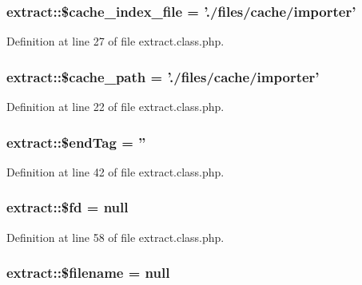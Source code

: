 \hypertarget{classextract_a6bd40f89eeb4e608723a39f5824d0c1e}{
\subsubsection[{\$cache\+\_\+index\+\_\+file}]{\setlength{\rightskip}{0pt plus 5cm}extract\+::\$cache\+\_\+index\+\_\+file = './files/cache/{\bf importer}'}}\label{classextract_a6bd40f89eeb4e608723a39f5824d0c1e}


Definition at line 27 of file extract.\+class.\+php.

\hypertarget{classextract_a00f1309c1e975d137a9f17ad9afc5d1e}{
\subsubsection[{\$cache\+\_\+path}]{\setlength{\rightskip}{0pt plus 5cm}extract\+::\$cache\+\_\+path = './files/cache/{\bf importer}'}}\label{classextract_a00f1309c1e975d137a9f17ad9afc5d1e}


Definition at line 22 of file extract.\+class.\+php.

\hypertarget{classextract_a46190b1f23addca9726e18aa15929c2a}{
\subsubsection[{\$end\+Tag}]{\setlength{\rightskip}{0pt plus 5cm}extract\+::\$end\+Tag = ''}}\label{classextract_a46190b1f23addca9726e18aa15929c2a}


Definition at line 42 of file extract.\+class.\+php.

\hypertarget{classextract_ae21a224916b245a23dd69139f58c81ed}{
\subsubsection[{\$fd}]{\setlength{\rightskip}{0pt plus 5cm}extract\+::\$fd = null}}\label{classextract_ae21a224916b245a23dd69139f58c81ed}


Definition at line 58 of file extract.\+class.\+php.

\hypertarget{classextract_abec232df6889e57dd327ddf132799f4c}{
\subsubsection[{\$filename}]{\setlength{\rightskip}{0pt plus 5cm}extract\+::\$filename = null}}\label{classextract_abec232df6889e57dd327ddf132799f4c}


